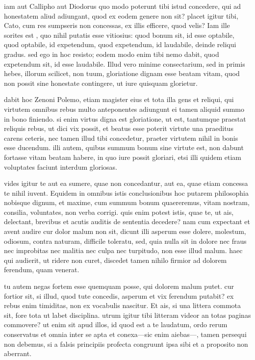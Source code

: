  iam aut Callipho aut Diodorus quo modo poterunt tibi istud concedere, qui ad honestatem aliud adiungant, quod ex eodem genere non sit? placet igitur tibi, Cato, cum res sumpseris non concessas, ex illis efficere, quod velis? Iam ille sorites est , quo nihil putatis esse vitiosius: quod bonum sit, id esse optabile, quod optabile, id expetendum, quod expetendum, id laudabile, deinde reliqui gradus. sed ego in hoc resisto; eodem modo enim tibi nemo dabit, quod expetendum sit, id esse laudabile. Illud vero minime consectarium, sed in primis hebes, illorum scilicet, non tuum, gloriatione dignam esse beatam vitam, quod non possit sine honestate contingere, ut iure quisquam glorietur.

 dabit hoc Zenoni Polemo, etiam magister eius et tota illa gens et reliqui, qui virtutem omnibus rebus multo anteponentes adiungunt ei tamen aliquid summo in bono finiendo. si enim virtus digna est gloriatione, ut est, tantumque praestat reliquis rebus, ut dici vix possit, et beatus esse poterit virtute una praeditus carens ceteris, nec tamen illud tibi concedetur, praeter virtutem nihil in bonis esse ducendum. illi autem, quibus summum bonum sine virtute est, non dabunt fortasse vitam beatam habere, in quo iure possit gloriari, etsi illi quidem etiam voluptates faciunt interdum gloriosas.

 vides igitur te aut ea sumere, quae non concedantur, aut ea, quae etiam concessa te nihil iuvent. Equidem in omnibus istis conclusionibus hoc putarem philosophia nobisque dignum, et maxime, cum summum bonum quaereremus, vitam nostram, consilia, voluntates, non verba corrigi. quis enim potest istis, quae te, ut ais, delectant, brevibus et acutis auditis de sententia decedere? nam cum expectant et avent audire cur dolor malum non sit, dicunt illi asperum esse dolere, molestum, odiosum, contra naturam, difficile toleratu, sed, quia nulla sit in dolore nec fraus nec improbitas nec malitia nec culpa nec turpitudo, non esse illud malum. haec qui audierit, ut ridere non curet, discedet tamen nihilo firmior ad dolorem ferendum, quam venerat.

 tu autem negas fortem esse quemquam posse, qui dolorem malum putet. cur fortior sit, si illud, quod tute concedis, asperum et vix ferendum putabit? ex rebus enim timiditas, non ex vocabulis nascitur. Et ais, si una littera commota sit, fore tota ut labet disciplina. utrum igitur tibi litteram videor an totas paginas commovere? ut enim sit apud illos, id quod est a te laudatum, ordo rerum conservatus et omnia inter se apta et conexa—sic enim aiebas—, tamen persequi non debemus, si a falsis principiis profecta congruunt ipsa sibi et a proposito non aberrant.

